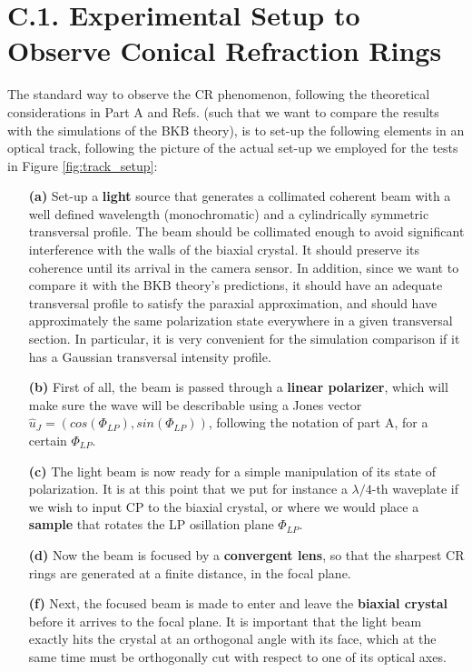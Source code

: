 \documentclass[11pt, a4paper, twoside]{article} %
\begin{document}
\section*{C.1. Experimental Setup to Observe Conical Refraction Rings}
The standard way to observe the CR phenomenon, following the theoretical considerations in Part A and Refs. \cite{Todor, Turpin} (such that we want to compare the results with the simulations of the BKB theory), is to set-up the following elements in an optical track, following the picture of the actual set-up we employed for the tests in Figure \ref{fig:track_setup}: 
\begin{itemize}
\item[\bf (a)] Set-up a {\bf light} source that generates a collimated coherent beam with a well defined wavelength (monochromatic) and a cylindrically symmetric transversal profile. The beam should be collimated enough to avoid significant interference with the walls of the biaxial crystal. It should preserve its coherence until its arrival in the camera sensor. In addition, since we want to compare it with the BKB theory's predictions, it should have an adequate transversal profile to satisfy the paraxial approximation, and should have approximately the same polarization state everywhere in a given transversal section. In particular, it is very convenient for the simulation comparison if it has a Gaussian transversal intensity profile.

\item[\bf (b)] First of all, the beam is passed through a {\bf linear polarizer}, which will make sure the wave will be describable using a Jones vector $\hat{u}_J=(cos(\Phi_{LP}), sin(\Phi_{LP}))$, following the notation of part A, for a certain $\Phi_{LP}$.

\item[\bf (c)] The light beam is now ready for a simple manipulation of its state of polarization. It is at this point that we put for instance a $\lambda/4$-th waveplate if we wish to input CP to the biaxial crystal, or where we would place a {\bf sample} that rotates the LP osillation plane $\Phi_{LP}$. 

\item[\bf (d)] Now the beam is focused by a {\bf convergent lens}, so that the sharpest CR rings are generated at a finite distance, in the focal plane.

\item[\bf (f)] Next, the focused beam is made to enter and leave the {\bf biaxial crystal} before it arrives to the focal plane. It is important that the light beam exactly hits the crystal at an orthogonal angle with its face, which at the same time must be orthogonally cut with respect to one of its optical axes. 


\end{itemize}
\end{document}
